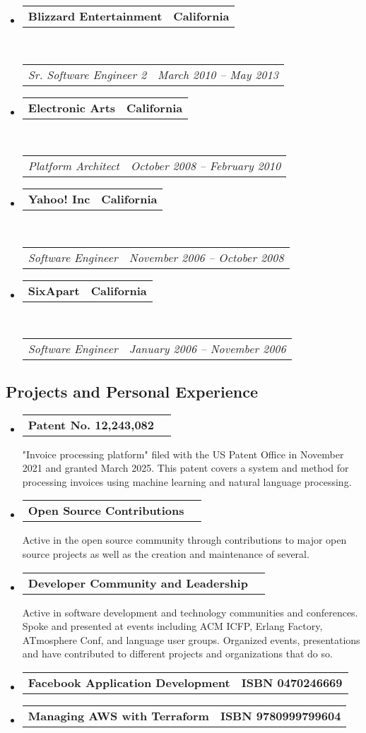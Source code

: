 \documentclass[10pt,letterpaper]{article}
\makeatletter
\newcommand{\headerrow}[2]
{\begin{tabular*}{\linewidth}{l@{\extracolsep{\fill}}r}
  #1 &
  #2 \\
\end{tabular*}}
\makeatother
\begin{document}
\begin{itemize}
  \item
  \headerrow
    {\textbf{Blizzard Entertainment}}
    {\textbf{California}}
  \\
  \headerrow
    {\emph{Sr. Software Engineer 2}}
    {\emph{March 2010 -- May 2013}}

  \item
  \headerrow
    {\textbf{Electronic Arts}}
    {\textbf{California}}
  \\
  \headerrow
    {\emph{Platform Architect}}
    {\emph{October 2008 -- February 2010}}

  \item
  \headerrow
    {\textbf{Yahoo! Inc}}
    {\textbf{California}}
  \\
  \headerrow
    {\emph{Software Engineer}}
    {\emph{November 2006 -- October 2008}}

  \item
  \headerrow
    {\textbf{SixApart}}
    {\textbf{California}}
  \\
  \headerrow
    {\emph{Software Engineer}}
    {\emph{January 2006 -- November 2006}}
\end{itemize}

\vspace{-0.4em}
\subsection*{Projects and Personal Experience}

\begin{itemize}
  \parskip=0.1em

  \item
  \headerrow
    {\textbf{Patent No. 12,243,082}}
    {\textbf{}}
    "Invoice processing platform" filed with the US Patent Office in November 2021 and granted March 2025. This patent covers a system and method for processing invoices using machine learning and natural language processing.
  \item
  \headerrow
    {\textbf{Open Source Contributions}}
    {\textbf{}}
    Active in the open source community through contributions to major open source projects as well as the creation and maintenance of several.
  \item
  \headerrow
    {\textbf{Developer Community and Leadership}}
    {\textbf{}}
    Active in software development and technology communities and conferences. Spoke and presented at events including ACM ICFP, Erlang Factory, ATmosphere Conf, and language user groups. Organized events, presentations and have contributed to different projects and organizations that do so.
  \item
  \headerrow
    {\textbf{Facebook Application Development}}
    {\textbf{ISBN 0470246669}}
  \item
  \headerrow
    {\textbf{Managing AWS with Terraform}}
    {\textbf{ISBN 9780999799604}}
\end{itemize}
\end{document}
